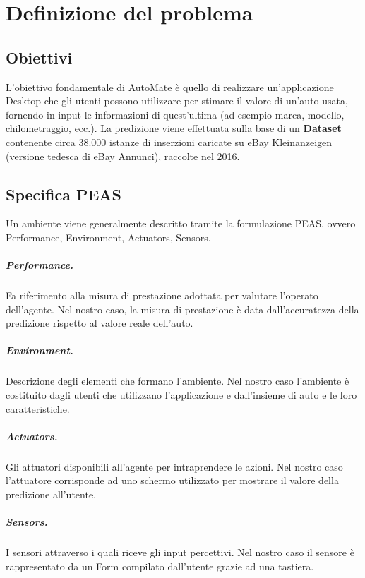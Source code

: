 \chapter{Definizione del problema}
\section{Obiettivi}
L'obiettivo fondamentale di AutoMate è quello di realizzare un'applicazione Desktop che gli utenti possono utilizzare per stimare il valore di un'auto usata, fornendo in input le informazioni di quest'ultima (ad esempio marca, modello, chilometraggio, ecc.). La predizione viene effettuata sulla base di un \textbf{Dataset} contenente circa 38.000 istanze di inserzioni caricate su eBay Kleinanzeigen (versione tedesca di eBay Annunci), raccolte nel 2016.
\medskip
\section{Specifica PEAS}
Un ambiente viene generalmente descritto tramite la formulazione PEAS, ovvero 
Performance, Environment, Actuators, Sensors.
\paragraph{Performance.} Fa riferimento alla misura di prestazione adottata per valutare l'operato dell'agente. Nel nostro caso, la misura di prestazione è data dall'accuratezza della predizione rispetto al valore reale dell'auto.
\paragraph{Environment.} Descrizione degli elementi che formano l'ambiente. Nel nostro caso l'ambiente è costituito dagli utenti che utilizzano l'applicazione e dall'insieme di auto e le loro caratteristiche.
\paragraph{Actuators.} Gli attuatori disponibili all'agente per intraprendere le azioni. Nel nostro caso l'attuatore corrisponde ad uno schermo utilizzato per mostrare il valore della predizione all'utente.
\paragraph{Sensors.} I sensori attraverso i quali riceve gli input percettivi. Nel nostro caso il sensore è rappresentato da un Form compilato dall'utente grazie ad una tastiera.

